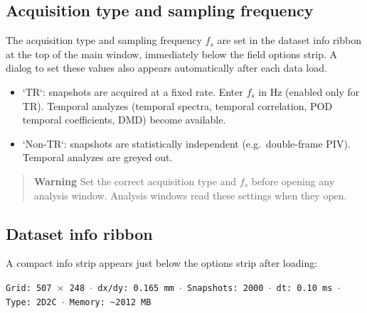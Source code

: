 \subsection{Acquisition type and sampling frequency}

The acquisition type and sampling frequency $f_s$ are set in the dataset info ribbon at the top of the main window, immediately below the field options strip. A dialog to set these values also appears automatically after each data load.

\begin{itemize}[leftmargin=1.5em]
  \item `TR`: snapshots are acquired at a fixed rate. Enter $f_s$ in Hz (enabled only for TR). Temporal analyzes (temporal spectra, temporal correlation, POD temporal coefficients, DMD) become available.
  \item `Non-TR`: snapshots are statistically independent (e.g.\ double-frame PIV). Temporal analyzes are greyed out.
\end{itemize}

\begin{quote}
\textbf{Warning}
Set the correct acquisition type and $f_s$ before opening any analysis window. Analysis windows read these settings when they open.
\end{quote}

\subsection{Dataset info ribbon}
\label{sec:datasetinfo}

A compact info strip appears just below the options strip after loading:

\begin{center}
\texttt{Grid: 507\,$\times$\,248 $\cdot$ dx/dy: 0.165\,mm $\cdot$ Snapshots: 2000 $\cdot$ dt: 0.10\,ms $\cdot$ Type: 2D2C $\cdot$ Memory: \textasciitilde{}2012\,MB}
\end{center}

